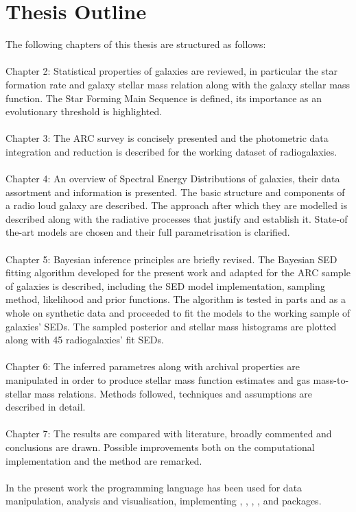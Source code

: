 \section{Thesis Outline}
The following chapters of this thesis are structured as follows:\\ \\
Chapter 2: Statistical properties of galaxies are reviewed, in particular the star formation rate and galaxy stellar mass relation along with the galaxy stellar mass function. The Star Forming Main Sequence is defined, its importance as an evolutionary threshold is highlighted.\\ \\
Chapter 3: The ARC survey is concisely presented and the photometric data integration and reduction is described for the working dataset of radiogalaxies.\\ \\
Chapter 4: An overview of Spectral Energy Distributions of galaxies, their data assortment and information is presented. The basic structure and components of a radio loud galaxy are described. The approach after which they are modelled is described along with the radiative processes that justify and establish it. State-of the-art models are chosen and their full parametrisation is clarified.  \\ \\
Chapter 5: Bayesian inference principles are briefly revised. The Bayesian SED fitting algorithm developed for the present work and adapted for the ARC sample of galaxies is described, including the SED model implementation, sampling method, likelihood and prior functions. The algorithm is tested in parts and as a whole on synthetic data and proceeded to fit the models to the working sample of galaxies' SEDs. The sampled posterior and stellar mass histograms are plotted along with 45 radiogalaxies' fit SEDs.\\ \\
Chapter 6: The inferred parametres along with archival properties are manipulated in order to produce stellar mass function estimates and gas mass-to-stellar mass relations. Methods followed, techniques and assumptions are described in detail.\\ \\ 
Chapter 7: The results are compared with literature, broadly commented and conclusions are drawn. Possible improvements both on the computational implementation and the method are remarked.\\ \\ 
In the present work the  programming language has been used for data manipulation, analysis and visualisation, implementing \cite{numpy}, \cite{pandas}, \cite{scipy}, \cite{astropy}, \cite{matplotlib} and \cite{ultranest2021} packages.










